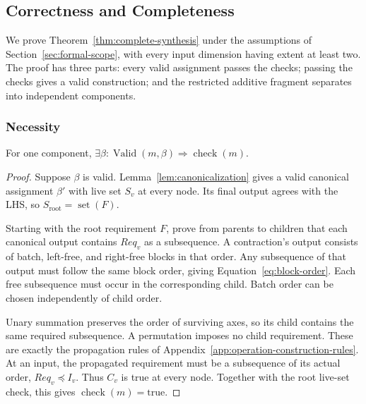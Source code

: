 \subsection{Correctness and Completeness}
\label{app:completeness-proof}
We prove Theorem~\ref{thm:complete-synthesis} under the assumptions of
Section~\ref{sec:formal-scope}, with every input dimension having extent
at least two. The proof has three parts: every valid
assignment passes the checks; passing the checks gives a valid construction;
and the restricted additive fragment separates into independent components.

\subsubsection{Necessity}
\begin{lemma}[Necessity]
\label{lem:necessity}
For one component,
$\exists\beta:\operatorname{Valid}(m,\beta)\Rightarrow\operatorname{check}(m)$.
\end{lemma}
\begin{proof}
Suppose $\beta$ is valid. Lemma~\ref{lem:canonicalization} gives a valid
canonical assignment $\beta'$ with live set $S_v$ at every node. Its final
output agrees with the LHS, so
$S_{\mathrm{root}}=\operatorname{set}(F)$.

Starting with the root requirement $F$, prove from parents to children that
each canonical output contains $Req_v$ as a subsequence. A contraction's
output consists of batch, left-free, and right-free blocks in that order.
Any subsequence of that output must follow the same block order, giving
Equation~\eqref{eq:block-order}. Each free subsequence must occur in the
corresponding child. Batch order can be chosen independently of child order.

Unary summation preserves the order of surviving axes, so its child contains
the same required subsequence. A permutation imposes no child requirement.
These are exactly the propagation rules of
Appendix~\ref{app:operation-construction-rules}. At an input, the propagated
requirement must be a subsequence of its actual order, $Req_v\preceq I_v$.
Thus $C_v$ is true at every node. Together with the root live-set check,
this gives $\operatorname{check}(m)=\mathrm{true}$.
\end{proof}

